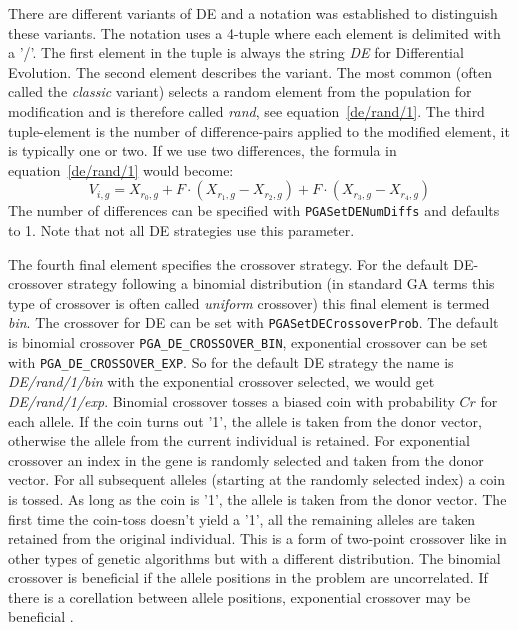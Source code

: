 \documentclass{report}
\begin{document}
There are different variants of DE and a notation was
established to distinguish these variants. The notation uses a 4-tuple
where each element is delimited with a '/'. The first element in the
tuple is always the string \textit{DE} for Differential Evolution. The second
element describes the variant. The most common (often called the
\textit{classic} variant) selects a random element from the population
for modification and is therefore called \textit{rand}, see
equation~\ref{de/rand/1}. The third tuple-element is the number of
difference-pairs applied to the modified element, it is typically one or
two. If we use two differences, the formula in equation~\ref{de/rand/1}
would become:
\begin{equation}\label{de/rand/2}
V_{i,g} = X_{r_0,g} + F \cdot (X_{r_1,g} - X_{r_2,g})
    + F \cdot (X_{r_3,g} - X_{r_4,g})
\end{equation}
The number of differences can be specified with \verb+PGASetDENumDiffs+
and defaults to 1. Note that not all DE strategies use this parameter.

The fourth final element specifies the crossover strategy. For the
default DE-crossover strategy following a binomial distribution (in
standard GA terms this type of crossover is often called
\textit{uniform} crossover) this final element is termed \textit{bin}.
The crossover for DE can be set with \verb+PGASetDECrossoverProb+. The
default is binomial crossover \verb+PGA_DE_CROSSOVER_BIN+, exponential
crossover can be set with \verb+PGA_DE_CROSSOVER_EXP+.
So for the default DE strategy the name is \textit{DE/rand/1/bin} with
the exponential crossover selected, we would get \textit{DE/rand/1/exp}.
Binomial crossover tosses a biased coin with probability $Cr$ for each
allele. If the coin turns out '1', the allele is taken from the donor
vector, otherwise the allele from the current individual is retained.
For exponential crossover an index in the gene is randomly selected and
taken from the donor vector. For all subsequent alleles (starting at the
randomly selected index) a coin is tossed. As long as the coin is '1',
the allele is taken from the donor vector. The first time the coin-toss
doesn't yield a '1', all the remaining alleles are taken retained from
the original individual. This is a form of two-point crossover like in
other types of genetic algorithms but with a different distribution.
The binomial crossover is beneficial if the allele positions in the
problem are uncorrelated. If there is a corellation between allele
positions, exponential crossover may be beneficial \cite{TF14}.
\end{document}
